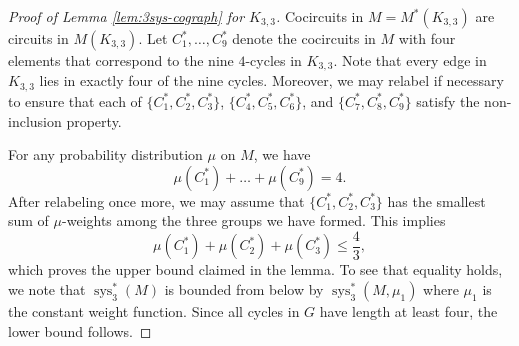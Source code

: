 \documentclass[reqno,12pt]{amsart}
\numberwithin{theorem}{section}
\theoremstyle{plain}
\theoremstyle{definition}
\theoremstyle{remark}
\numberwithin{equation}{section}
\numberwithin{table}{section}
\DeclareMathOperator{\sys}{sys}
\begin{document}
\begin{proof}[Proof of Lemma \ref{lem:3sys-cograph} for $K_{3,3}$]
Cocircuits in $M = M^*(K_{3,3})$ are circuits in $M(K_{3,3})$. Let $C_1^*, \ldots, C_9^*$ denote the cocircuits in $M$ with four elements that correspond to the nine $4$-cycles in $K_{3,3}$. Note that every edge in $K_{3,3}$ lies in exactly four of the nine cycles. Moreover, we may relabel if necessary to ensure that each of $\{C_1^*, C_2^*, C_3^*\}$, $\{C_4^*,C_5^*,C_6^*\}$, and $\{C_7^*,C_8^*,C_9^*\}$ satisfy the non-inclusion property.

For any probability distribution $\mu$ on $M$, we have
    \[\mu(C_1^*) + \ldots + \mu(C_9^*) = 4.\]
After relabeling once more, we may assume that $\{C_1^*, C_2^*, C_3^*\}$ has the smallest sum of $\mu$-weights among the three groups we have formed. This implies
    \[\mu(C_1^*) + \mu(C_2^*) + \mu(C_3^*) \leq \frac 4 3,\]
which proves the upper bound claimed in the lemma. To see that equality holds, we note that $\sys_3^*(M)$ is bounded from below by $\sys_3^*(M, \mu_1)$ where $\mu_1$ is the constant weight function. Since all cycles in $G$ have length at least four, the lower bound follows.
\end{proof}
\end{document}
